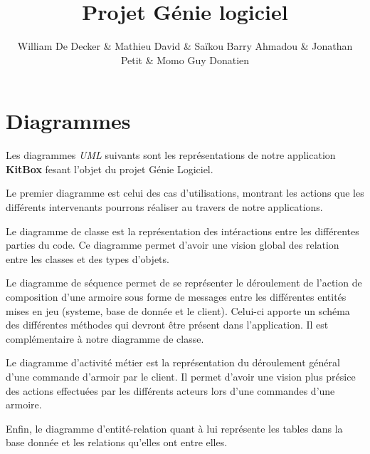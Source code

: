 \documentclass{ecam}
\begin{document}
\title{Projet Génie logiciel \\\vspace{10pt}\fontsize{30pt}{60pt}\selectfont{KitBox}}
\author{William De Decker \& Mathieu David \& Saïkou Barry Ahmadou \linebreak \& Jonathan Petit \& Momo Guy Donatien}
\maketitle

\chapter{Diagrammes}
Les diagrammes \textit{UML} suivants sont les représentations de notre application
\textbf{KitBox} fesant l'objet du projet Génie Logiciel.

Le premier diagramme est celui des cas d'utilisations, montrant
les actions que les différents intervenants pourrons réaliser au travers
de notre applications.

Le diagramme de classe est la représentation des intéractions entre les
différentes parties du code. Ce diagramme permet d'avoir une vision global
des relation entre les classes et des types d'objets.

Le diagramme de séquence permet de se représenter le déroulement de l'action de
composition d'une armoire sous forme de messages entre les différentes entités
mises en jeu (systeme, base de donnée et le client). Celui-ci apporte un schéma
des différentes méthodes qui devront être présent dans l'application. Il est
complémentaire à notre diagramme de classe.

Le diagramme d'activité métier est la représentation du déroulement général d'une
commande d'armoir par le client. Il permet d'avoir une vision plus présice des
actions effectuées par les différents acteurs lors d'une commandes d'une armoire.

Enfin, le diagramme d'entité-relation quant à lui représente les tables dans la base
donnée et les relations qu'elles ont entre elles.
\end{document}

